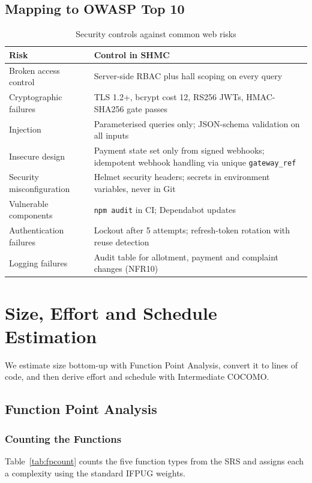 \documentclass[11pt,a4paper]{report}
\begin{document}
\section{Mapping to OWASP Top 10}
\begin{table}[H]
\centering\small
\caption{Security controls against common web risks}\label{tab:owasp}
\begin{tabularx}{\textwidth}{lL}
\toprule
\textbf{Risk} & \textbf{Control in SHMC}\\
\midrule
Broken access control & Server-side RBAC plus hall scoping on every query\\
Cryptographic failures & TLS 1.2+, bcrypt cost 12, RS256 JWTs, HMAC-SHA256 gate passes\\
Injection & Parameterised queries only; JSON-schema validation on all inputs\\
Insecure design & Payment state set only from signed webhooks; idempotent webhook handling via unique \texttt{gateway\_ref}\\
Security misconfiguration & Helmet security headers; secrets in environment variables, never in Git\\
Vulnerable components & \texttt{npm audit} in CI; Dependabot updates\\
Authentication failures & Lockout after 5 attempts; refresh-token rotation with reuse detection\\
Logging failures & Audit table for allotment, payment and complaint changes (NFR10)\\
\bottomrule
\end{tabularx}
\end{table}
\chapter{Size, Effort and Schedule Estimation}
We estimate size bottom-up with Function Point Analysis, convert it to lines of code, and then derive effort and schedule with Intermediate COCOMO.

\section{Function Point Analysis}
\subsection{Counting the Functions}
Table~\ref{tab:fpcount} counts the five function types from the SRS and assigns each a complexity using the standard IFPUG weights.
\end{document}
